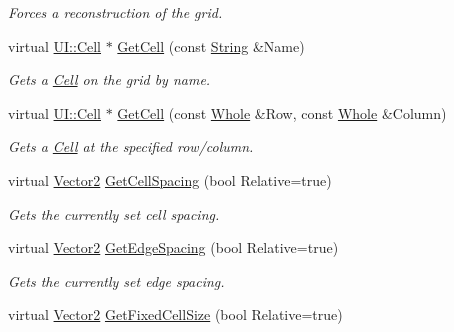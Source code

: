 \begin{DoxyCompactItemize}
\begin{DoxyCompactList}\small\item\em Forces a reconstruction of the grid. \item\end{DoxyCompactList}\item 
virtual \hyperlink{classMezzanine_1_1UI_1_1Cell}{UI::Cell} $\ast$ \hyperlink{classMezzanine_1_1UI_1_1CellGrid_a5d6f3a71557437f087b83698e4cdc69c}{GetCell} (const \hyperlink{namespaceMezzanine_acf9fcc130e6ebf08e3d8491aebcf1c86}{String} \&Name)
\begin{DoxyCompactList}\small\item\em Gets a \hyperlink{classMezzanine_1_1UI_1_1Cell}{Cell} on the grid by name. \item\end{DoxyCompactList}\item 
virtual \hyperlink{classMezzanine_1_1UI_1_1Cell}{UI::Cell} $\ast$ \hyperlink{classMezzanine_1_1UI_1_1CellGrid_ab53b9ca40c4c7a2133f9cc6511842caf}{GetCell} (const \hyperlink{namespaceMezzanine_adcbb6ce6d1eb4379d109e51171e2e493}{Whole} \&Row, const \hyperlink{namespaceMezzanine_adcbb6ce6d1eb4379d109e51171e2e493}{Whole} \&Column)
\begin{DoxyCompactList}\small\item\em Gets a \hyperlink{classMezzanine_1_1UI_1_1Cell}{Cell} at the specified row/column. \item\end{DoxyCompactList}\item 
virtual \hyperlink{classMezzanine_1_1Vector2}{Vector2} \hyperlink{classMezzanine_1_1UI_1_1CellGrid_abe28918cfb8b1e3bbfbe9ac615b3b653}{GetCellSpacing} (bool Relative=true)
\begin{DoxyCompactList}\small\item\em Gets the currently set cell spacing. \item\end{DoxyCompactList}\item 
virtual \hyperlink{classMezzanine_1_1Vector2}{Vector2} \hyperlink{classMezzanine_1_1UI_1_1CellGrid_a8717b4d4b9f4fe8759ec6c10101f2248}{GetEdgeSpacing} (bool Relative=true)
\begin{DoxyCompactList}\small\item\em Gets the currently set edge spacing. \item\end{DoxyCompactList}\item 
virtual \hyperlink{classMezzanine_1_1Vector2}{Vector2} \hyperlink{classMezzanine_1_1UI_1_1CellGrid_a4f8fa97d440202c7216ae468b069afa0}{GetFixedCellSize} (bool Relative=true)

\end{DoxyCompactItemize}
